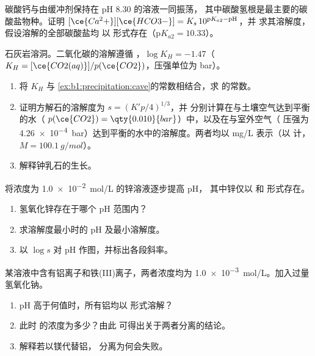 \begin{exercise}[$\star\star$]\label{exo:b1:precipitation:9}
碳酸钙与由缓冲剂保持在 pH 8.30 的溶液一同振荡，
其中碳酸氢根是最主要的碳酸盐物种。证明
$[\ce{Ca^2+}][\ce{HCO3-}] = K_s\,10^{\mathrm{p}K_{a2} - \mathrm{pH}}$，并
求其溶解度，假设溶解的全部碳酸盐均
以  形式存在（$\mathrm{p}K_{a2} = 10.33$）。
\end{exercise}

\begin{exercise}[$\star\star\star$]\label{exo:b1:precipitation:10}
石灰岩溶洞。二氧化碳的溶解遵循
，$\log K_H = -1.47$（$K_H =
[\ce{CO2(aq)}]/p(\ce{CO2})$，压强单位为 bar）。
\begin{enumerate}
  \item 将 $K_H$ 与
        \cref{ex:b1:precipitation:cave}的常数相结合，求
         的常数。
  \item 证明方解石的溶解度为 $s = (K'p/4)^{1/3}$，并
        分别计算在与土壤空气达到平衡的水（
        $p(\ce{CO2}) = \qty{0.010}{bar}$）中，以及在与室外空气（
        压强为 \qty{4.26e-4}{bar}）达到平衡的水中的溶解度。两者均以 \unit{mg/L} 表示（以  计，
        $M = \qty{100.1}{g/mol}$）。
  \item 解释钟乳石的生长。
\end{enumerate}
\end{exercise}

\begin{exercise}[$\star\star\star$]\label{exo:b1:precipitation:11}
将浓度为 \qty{1.0e-2}{mol/L} 的锌溶液逐步提高 pH，
其中锌仅以  和  形式存在。
\begin{enumerate}
  \item 氢氧化锌存在于哪个 pH 范围内？
  \item 求溶解度最小时的 pH 及最小溶解度。
  \item 以 $\log s$ 对 pH 作图，并标出各段斜率。
\end{enumerate}
\end{exercise}

\begin{exercise}[$\star\star\star$]\label{exo:b1:precipitation:12}
某溶液中含有铝离子和铁(III)离子，两者浓度均为
\qty{1.0e-3}{mol/L}。加入过量氢氧化钠。
\begin{enumerate}
  \item pH 高于何值时，所有铝均以  形式溶解？
  \item 此时  的浓度为多少？由此
        可得出关于两者分离的结论。
  \item 解释若以镁代替铝，
        分离为何会失败。
\end{enumerate}
\end{exercise}

